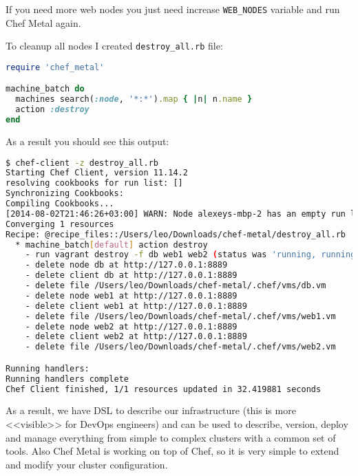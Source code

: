If you need more web nodes you just need increase \lstinline!WEB_NODES! variable and run Chef Metal again.

To cleanup all nodes I created \lstinline!destroy_all.rb! file:

\begin{lstlisting}[language=Ruby,label=lst:tat-chef-metal8]
require 'chef_metal'

machine_batch do
  machines search(:node, '*:*').map { |n| n.name }
  action :destroy
end
\end{lstlisting}

As a result you should see this output:

\begin{lstlisting}[language=Bash,label=lst:tat-chef-metal9]
$ chef-client -z destroy_all.rb
Starting Chef Client, version 11.14.2
resolving cookbooks for run list: []
Synchronizing Cookbooks:
Compiling Cookbooks...
[2014-08-02T21:46:26+03:00] WARN: Node alexeys-mbp-2 has an empty run list.
Converging 1 resources
Recipe: @recipe_files::/Users/leo/Downloads/chef-metal/destroy_all.rb
  * machine_batch[default] action destroy
    - run vagrant destroy -f db web1 web2 (status was 'running, running, running')
    - delete node db at http://127.0.0.1:8889
    - delete client db at http://127.0.0.1:8889
    - delete file /Users/leo/Downloads/chef-metal/.chef/vms/db.vm
    - delete node web1 at http://127.0.0.1:8889
    - delete client web1 at http://127.0.0.1:8889
    - delete file /Users/leo/Downloads/chef-metal/.chef/vms/web1.vm
    - delete node web2 at http://127.0.0.1:8889
    - delete client web2 at http://127.0.0.1:8889
    - delete file /Users/leo/Downloads/chef-metal/.chef/vms/web2.vm

Running handlers:
Running handlers complete
Chef Client finished, 1/1 resources updated in 32.419881 seconds
\end{lstlisting}

As a result, we have DSL to describe our infrastructure (this is more <<visible>> for DevOps engineers) and can be used to describe, version, deploy and manage everything from simple to complex clusters with a common set of tools. Also Chef Metal is working on top of Chef, so it is very simple to extend and modify your cluster configuration.